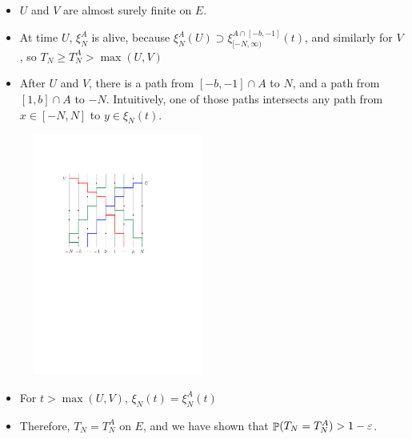 \documentclass{beamer}
\newcommand{\ep}{\varepsilon}
\begin{document}
\begin{frame}
  \begin{itemize}
    \item $U$ and $V$ are almost surely finite on $E$.
    \item At time $U$, $\xi_{N}^{A}$ is alive, because $\xi_{N}^{A}(U) \supset \xi_{[-N,\infty)}^{A \cap [-b,-1]}(t)$, and similarly for $V$, so $T_{N} \geq T_{N}^{A} > \max(U,V)$
  \end{itemize}
\end{frame}

\begin{frame}
  \begin{itemize}
    \item After $U$ and $V$, there is a path from $[-b,-1] \cap A$ to $N$, and a path from $[1,b] \cap A$ to $-N$. Intuitively, one of those paths intersects any path from $x \in [-N,N]$ to $y \in \xi_{N}(t)$.
  \end{itemize}
  \begin{figure}
    \centering
    \includegraphics[width=0.5\textwidth]{U_V_blocked.pdf}
  \end{figure}
\end{frame}

\begin{frame}
  \begin{itemize}
    \item For $t > \max(U,V)$, $\xi_{N}(t) = \xi_{N}^{A}(t)$
    \item Therefore, $T_{N} = T_{N}^{A}$ on $E$, and we have shown that $\Prob(T_{N} = T_{N}^{A}) > 1 - \ep$.
  \end{itemize}
\end{frame}
\end{document}
